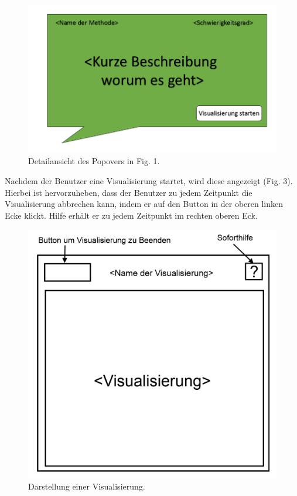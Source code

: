 \documentclass{article}
\begin{document}
\begin{figure}[H]
  \centering
    \includegraphics[width=\textwidth]{resources/ui_walkthrough_popover-draft}
  \caption{Detailansicht des Popovers in Fig. 1.}
\end{figure}

Nachdem der Benutzer eine Visualisierung startet, wird diese angezeigt (Fig. 3). Hierbei ist hervorzuheben, dass der Benutzer zu jedem Zeitpunkt die Visualisierung abbrechen kann, indem er auf den Button in der oberen linken Ecke klickt. Hilfe erhält er zu jedem Zeitpunkt im rechten oberen Eck.

\begin{figure}[H]
  \centering
    \includegraphics[width=\textwidth]{resources/ui_walkthrough_visualisation-draft}
  \caption{Darstellung einer Visualisierung.}
\end{figure}
\end{document}
